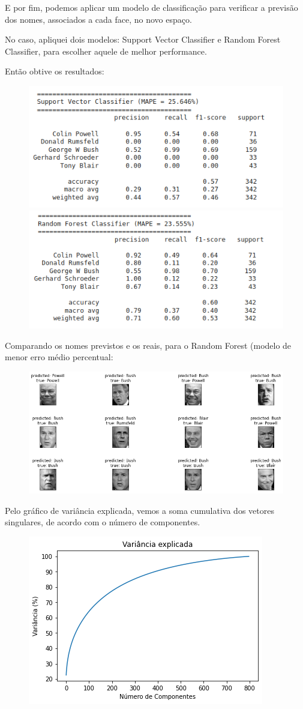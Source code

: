 \documentclass{article}
\begin{document}
E por fim, podemos aplicar um modelo de classificação para verificar a previsão dos nomes, associados a cada face, no novo espaço.


No caso, apliquei dois modelos: Support Vector Classifier e Random Forest Classifier, para escolher aquele de melhor performance.

Então obtive os resultados:


\begin{figure}[H]
\begin{center}
  \includegraphics[width=0.45\linewidth]{images/svc.png}
  \includegraphics[width=0.45\linewidth]{images/randf.png}
\end{center}
\end{figure}

Comparando os nomes previstos e os reais, para o Random Forest (modelo de menor erro médio percentual:

\begin{figure}[H]
\begin{center}
  \includegraphics[width=0.65\linewidth]{images/comparacoes_rf.png}
 \end{center}
\end{figure}

Pelo gráfico de variância explicada, vemos a soma cumulativa dos vetores singulares, de acordo com o número de componentes.

\begin{figure}[H]
\begin{center}
  \includegraphics[width=0.45\linewidth]{images/variancia_explicada.png}
\end{center}
\end{figure}
\end{document}
